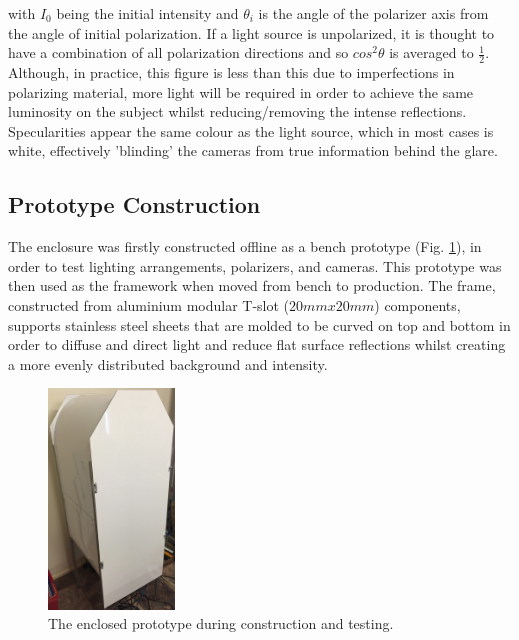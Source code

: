 \documentclass[fleqn,twoside]{article}
\begin{document}
with $I_{0}$ being the initial intensity and $\theta_{i}$ is the angle of the polarizer axis from the angle of initial polarization. If a light source is unpolarized, it is thought to have a combination of all polarization directions and so $cos^{2}\theta$ is averaged to $\frac{1}{2}$. Although, in practice, this figure is less than this due to imperfections in polarizing material, more light will be required in order to achieve the same luminosity on the subject \cite{rox, sommer} whilst reducing/removing the intense reflections. Specularities appear the same colour as the light source, which in most cases is white, effectively 'blinding' the cameras from true information behind the glare.  






\subsection{Prototype Construction}
\label{sec:prototype_contruct}

The enclosure was firstly constructed offline as a bench prototype (Fig. \ref{fig:bench_construct}), in order to test lighting arrangements, polarizers, and cameras. This prototype was then used as the framework when moved from bench to production. The frame, constructed from aluminium modular T-slot ($20mmx20mm$) components, supports stainless steel sheets that are molded to be curved on top and bottom in order to diffuse and direct light and reduce flat surface reflections whilst creating a more evenly distributed background and intensity. 


\begin{figure}
	\begin{center}
		\includegraphics[width=0.3\textwidth]{images/bench_construct.jpg}
	\end{center}
	\caption{The enclosed prototype during construction and testing.}
	\label{fig:bench_construct}
\end{figure}   
\end{document}
